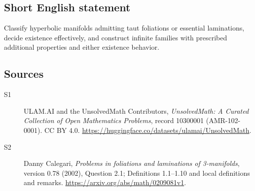 \documentclass[11pt]{article}
\begin{document}
\subsection{Short English statement}
Classify hyperbolic manifolds admitting taut foliations or essential laminations, decide existence effectively, and construct infinite families with prescribed additional properties and either existence behavior.
\subsection{Sources}
\begin{description}
\item[\hypertarget{source:10300001:1}{S1}] ULAM.AI and the UnsolvedMath Contributors, \emph{UnsolvedMath: A Curated Collection of Open Mathematics Problems}, record 10300001 (AMR-102-0001). CC BY 4.0. \url{https://huggingface.co/datasets/ulamai/UnsolvedMath}.
\item[\hypertarget{source:10300001:2}{S2}] Danny Calegari, \emph{Problems in foliations and laminations of 3-manifolds}, version 0.78 (2002), Question 2.1; Definitions 1.1--1.10 and local definitions and remarks. \url{https://arxiv.org/abs/math/0209081v1}.
\end{description}
\label{end:10300001}
\end{document}
